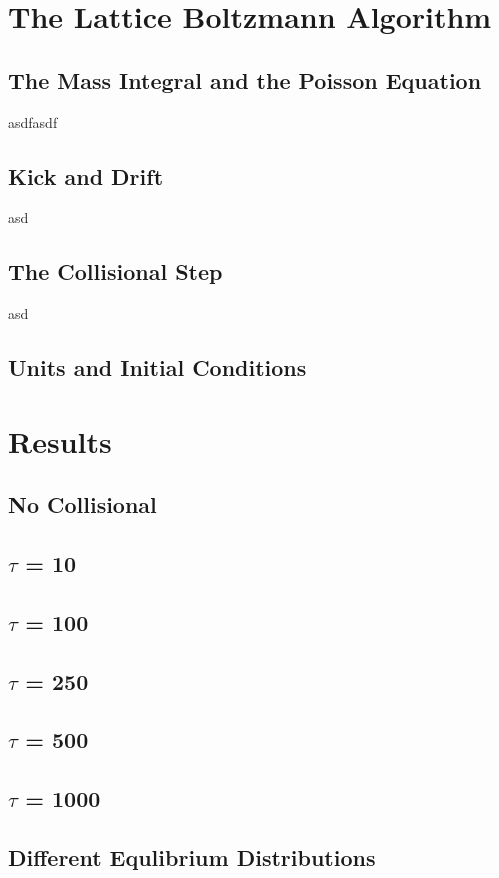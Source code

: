 \chapter{The Lattice Boltzmann Algorithm}
\section{The Mass Integral and the Poisson Equation}
asdfasdf
\section{Kick and Drift}
asd
\section{The Collisional Step}
asd
\section{Units and Initial Conditions}

\chapter{Results}
\section{No Collisional}
\section{$\tau$ = 10}
\section{$\tau$ = 100}
\section{$\tau$ = 250}
\section{$\tau$ = 500}
\section{$\tau$ = 1000}
\section{Different Equlibrium Distributions}